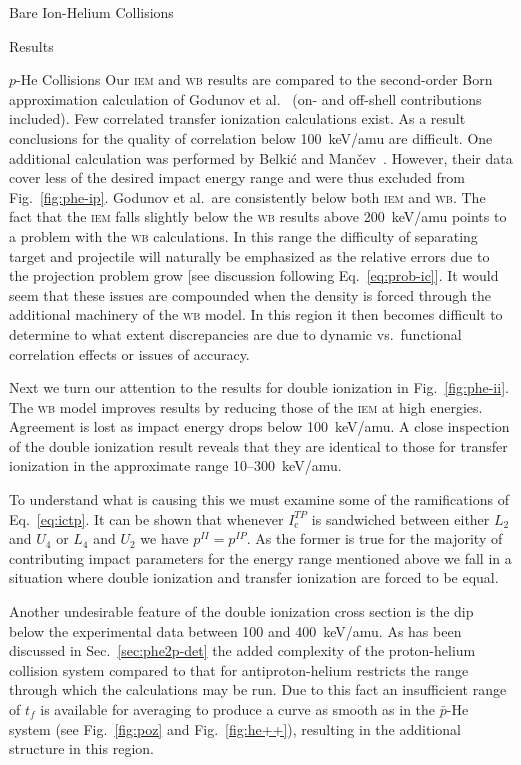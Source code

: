 \documentclass[a5paper, 9 pt]{extreport}
\begin{document}
\begin{chapter}{Bare Ion-Helium Collisions \label{chap:p-he2p-he}}
\begin{section}{Results \label{sec:phe2p-res}}
\begin{subsection}{\texorpdfstring{$p$}{p}-He Collisions \label{sec:phe-res}}
         Our \textsc{iem} and \textsc{wb} results are compared to the second-order Born approximation
         calculation of Godunov et al.~\cite{Godunov-06} (on- and off-shell contributions included). Few
         correlated transfer ionization calculations exist. As a result conclusions for the quality of
         correlation below 100~keV/amu are difficult. One additional calculation was performed by
         Belki\'{c} and Man\v{c}ev~\cite{BM-11}. However, their data cover less of the desired impact
         energy range and were thus excluded from Fig.~\ref{fig:phe-ip}. Godunov et al.\ are
         consistently below both \textsc{iem} and \textsc{wb}. The fact that the \textsc{iem} falls
         slightly below the \textsc{wb} results above 200~keV/amu points to a problem with the
         \textsc{wb} calculations. In this range the difficulty of separating target and projectile will
         naturally be emphasized as the relative errors due to the projection problem grow [see
         discussion following Eq.~\eqref{eq:prob-ic}]. It would seem that these issues are compounded
         when the density is forced through the additional machinery of the \textsc{wb} model. In this
         region it then becomes difficult to determine to what extent discrepancies are due to dynamic
         vs.\ functional correlation effects or issues of accuracy.

         Next we turn our attention to the results for double ionization in Fig.~\ref{fig:phe-ii}. The
         \textsc{wb} model improves results by reducing those of the \textsc{iem} at high energies.
         Agreement is lost as impact energy drops below 100~keV/amu. A close inspection of the double
         ionization result reveals that they are identical to those for transfer ionization in the
         approximate range 10--300~keV/amu.

         To understand what is causing this we must examine some of the ramifications of
         Eq.~\eqref{eq:ictp}. It can be shown that whenever $I^{TP}_\mathrm{c}$ is sandwiched between
         either $L_2$ and $U_4$ or $L_4$ and $U_2$ we have $p^{II} = p^{IP}$. As the former is true for
         the majority of contributing impact parameters for the energy range mentioned above we fall in
         a situation where double ionization and transfer ionization are forced to be equal.

         Another undesirable feature of the double ionization cross section is the dip below the
         experimental data between 100 and 400~keV/amu. As has been discussed in
         Sec.~\ref{sec:phe2p-det} the added complexity of the proton-helium collision system compared to
         that for antiproton-helium restricts the range through which the calculations may be run. Due
         to this fact an insufficient range of $t_f$ is available for averaging to produce a curve as
         smooth as in the $\bar{p}$-He system (see Fig.~\ref{fig:poz} and Fig.~\ref{fig:he++}),
         resulting in the additional structure in this region.


\end{subsection}
\end{section}
\end{chapter}
\end{document}
